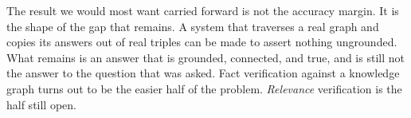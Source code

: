 The result we would most want carried forward is not the accuracy margin. It is
the shape of the gap that remains. A system that traverses a real graph and
copies its answers out of real triples can be made to assert nothing ungrounded.
What remains is an answer that is grounded, connected, and true, and is still
not the answer to the question that was asked. Fact verification against a
knowledge graph turns out to be the easier half of the problem. \emph{Relevance}
verification is the half still open.

\endinput
